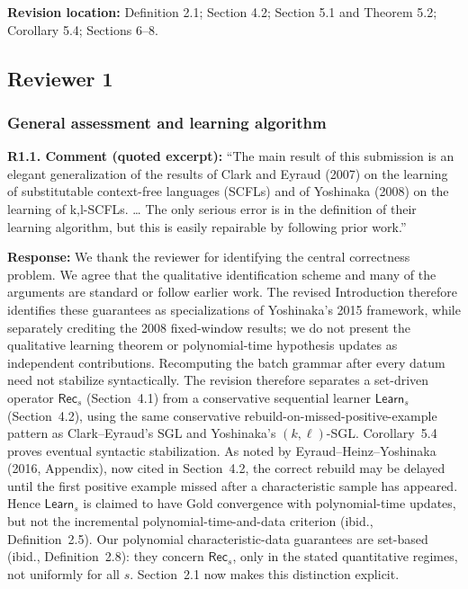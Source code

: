 \documentclass[
  10pt,
  a4paper,
]{article}
\begin{document}
\textbf{Revision location:} Definition 2.1; Section 4.2; Section 5.1 and Theorem 5.2; Corollary 5.4; Sections 6--8.


\subsection{Reviewer 1}\label{reviewer-1}

\subsubsection{General assessment and learning
algorithm}\label{general-assessment-and-learning-algorithm}

\textbf{R1.1. Comment (quoted excerpt):} ``The main result of this submission
is an elegant generalization of the results of Clark and Eyraud (2007)
on the learning of substitutable context-free languages (SCFLs) and of
Yoshinaka (2008) on the learning of k,l-SCFLs. \ldots{} The only serious
error is in the definition of their learning algorithm, but this is
easily repairable by following prior work.''

\textbf{Response:} We thank the reviewer for identifying the central correctness problem.
We agree that the qualitative identification scheme and many of
the arguments are standard or follow earlier work.
The revised Introduction therefore identifies these guarantees
as specializations of Yoshinaka's 2015 framework, while
separately crediting the 2008 fixed-window results; we do not
present the qualitative learning theorem or polynomial-time
hypothesis updates as independent contributions.
Recomputing the batch grammar after every datum need not stabilize
syntactically.  The revision therefore separates a set-driven operator
$\mathsf{Rec}_s$ (Section~4.1) from a conservative sequential learner
$\mathsf{Learn}_s$ (Section~4.2), using the same conservative rebuild-on-missed-positive-example
pattern as Clark--Eyraud's SGL and Yoshinaka's $(k,\ell)$-SGL.
Corollary~5.4 proves eventual syntactic stabilization. As noted by
Eyraud--Heinz--Yoshinaka (2016, Appendix), now cited in Section~4.2,
the correct rebuild may be delayed until the first positive example
missed after a characteristic sample has appeared. Hence $\mathsf{Learn}_s$ is claimed to
have Gold convergence with polynomial-time updates, but not the incremental
polynomial-time-and-data criterion (ibid., Definition~2.5). Our polynomial
characteristic-data guarantees are set-based (ibid., Definition~2.8): they
concern $\mathsf{Rec}_s$, only in the stated quantitative regimes, not
uniformly for all $s$. Section~2.1 now makes this distinction explicit.
\end{document}
